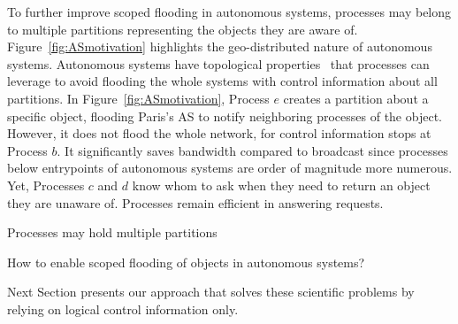 To further improve scoped flooding in autonomous systems, processes
may belong to multiple partitions representing the objects they are
aware of. Figure~\ref{fig:ASmotivation} highlights the geo-distributed
nature of autonomous systems. Autonomous systems have topological
properties~\cite{nur2018geography} that processes can leverage to
avoid flooding the whole systems with control information about all
partitions. In Figure~\ref{fig:ASmotivation}, Process $e$ creates a
partition about a specific object, flooding Paris's AS to notify
neighboring processes of the object. However, it does not flood the
whole network, for control information stops at Process $b$. It
significantly saves bandwidth compared to broadcast since processes
below entrypoints of autonomous systems are order of magnitude more
numerous. Yet, Processes $c$ and $d$ know whom to ask when they need
to return an object they are unaware of. Processes remain efficient in
answering requests. 

\begin{definition}
  Processes may hold multiple partitions 
   
\end{definition}

\begin{problem}
  How to enable scoped flooding of objects in autonomous systems?
\end{problem}

Next Section presents our approach that solves these scientific
problems by relying on logical control information only.


